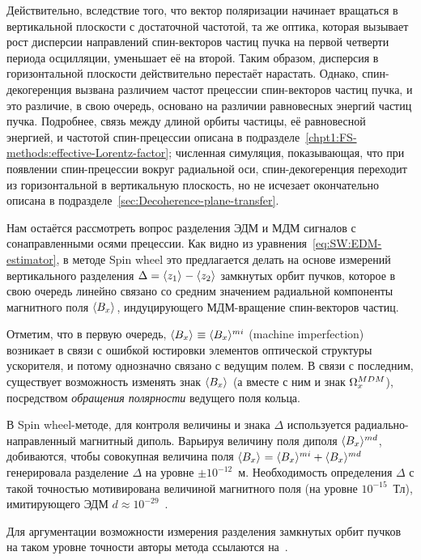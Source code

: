 Действительно, вследствие того, что 
вектор поляризации начинает вращаться в вертикальной плоскости с достаточной частотой, та же оптика,
которая вызывает рост дисперсии направлений спин-векторов частиц пучка на первой четверти
 периода осцилляции, уменьшает её на второй. Таким образом, дисперсия в горизонтальной плоскости
 действительно перестаёт нарастать. Однако, спин-декогеренция вызвана различием частот
 прецессии спин-векторов частиц пучка, и это различие, в свою очередь, основано на различии 
 равновесных энергий частиц пучка. Подробнее, связь между длиной орбиты частицы, её равновесной энергией, и частотой спин-прецессии описана в подразделе~\ref{chpt1:FS-methods:effective-Lorentz-factor};
 численная симуляция, показывающая, что при появлении спин-прецессии вокруг радиальной оси, 
 спин-декогеренция переходит из горизонтальной в вертикальную плоскость, но не исчезает окончательно
 описана в подразделе~\ref{sec:Decoherence-plane-transfer}.
 
Нам остаётся рассмотреть вопрос разделения ЭДМ и МДМ сигналов с сонаправленными осями прецессии.
Как видно из уравнения~\eqref{eq:SW:EDM-estimator}, в методе Spin wheel это предлагается делать 
на основе измерений вертикального разделения $\Delta = \avg{z_1} - \avg{z_2}$ замкнутых орбит пучков,
которое в свою очередь линейно связано со средним значением радиальной компоненты магнитного поля
$\avg{B_x}$, индуцирующего МДМ-вращение спин-векторов частиц. 

Отметим, что в первую очередь, $\avg{B_x} \equiv \avg{B_x}^{mi}$ (machine imperfection) возникает в связи 
с ошибкой юстировки элементов оптической структуры ускорителя, и потому 
однозначно связано с ведущим полем. 
В связи с последним, существует возможность изменять знак $\avg{B_x}$ 
(а вместе с ним и знак $\Omega_x^{MDM}$), посредством \emph{обращения полярности} ведущего поля кольца.

В Spin wheel-методе, для контроля величины и знака $\Delta$ используется радиально-направленный
магнитный диполь. Варьируя величину поля диполя $\avg{B_x}^{md}$, добиваются, чтобы совокупная величина 
поля ${\avg{B_x} = \avg{B_x}^{mi} + \avg{B_x}^{md}}$ генерировала разделение $\Delta$ на уровне 
$\pm 10^{-12}$~м. Необходимость определения $\Delta$ с такой точностью мотивирована
величиной магнитного поля (на уровне $10^{-15}$~Тл), имитирующего ЭДМ ${d\approx 10^{-29}}$~\ecm.

Для аргументации возможности измерения разделения замкнутых орбит пучков на таком уровне точности
авторы метода ссылаются на~\cite{Kawall:BPM}. 


